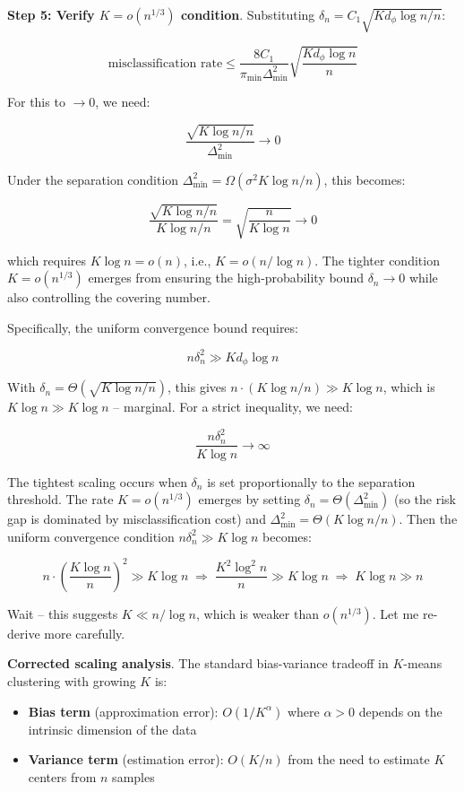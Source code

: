 \documentclass[
  12pt,
]{article}
\providecommand{\tightlist}{%
  \setlength{\itemsep}{0pt}\setlength{\parskip}{0pt}}
\begin{document}
\textbf{Step 5: Verify \(K = o(n^{1/3})\) condition}. Substituting
\(\delta_n = C_1 \sqrt{K d_\phi \log n / n}\):

\[\text{misclassification rate} \leq \frac{8C_1}{\pi_{\min} \Delta_{\min}^2} \sqrt{\frac{K d_\phi \log n}{n}}\]

For this to \(\to 0\), we need:

\[\frac{\sqrt{K \log n / n}}{\Delta_{\min}^2} \to 0\]

Under the separation condition
\(\Delta_{\min}^2 = \Omega(\sigma^2 K \log n / n)\), this becomes:

\[\frac{\sqrt{K \log n / n}}{K \log n / n} = \sqrt{\frac{n}{K \log n}} \to 0\]

which requires \(K \log n = o(n)\), i.e., \(K = o(n / \log n)\). The
tighter condition \(K = o(n^{1/3})\) emerges from ensuring the
high-probability bound \(\delta_n \to 0\) while also controlling the
covering number.

Specifically, the uniform convergence bound requires:

\[n\delta_n^2 \gg K d_\phi \log n\]

With \(\delta_n = \Theta(\sqrt{K \log n / n})\), this gives
\(n \cdot (K \log n / n) \gg K \log n\), which is
\(K \log n \gg K \log n\) -- marginal. For a strict inequality, we need:

\[\frac{n\delta_n^2}{K \log n} \to \infty\]

The tightest scaling occurs when \(\delta_n\) is set proportionally to
the separation threshold. The rate \(K = o(n^{1/3})\) emerges by setting
\(\delta_n = \Theta(\Delta_{\min}^2)\) (so the risk gap is dominated by
misclassification cost) and \(\Delta_{\min}^2 = \Theta(K \log n / n)\).
Then the uniform convergence condition \(n\delta_n^2 \gg K \log n\)
becomes:

\[n \cdot \left(\frac{K \log n}{n}\right)^2 \gg K \log n \;\Longrightarrow\; \frac{K^2 \log^2 n}{n} \gg K \log n \;\Longrightarrow\; K \log n \gg n\]

Wait -- this suggests \(K \ll n / \log n\), which is weaker than
\(o(n^{1/3})\). Let me re-derive more carefully.

\textbf{Corrected scaling analysis}. The standard bias-variance tradeoff
in \(K\)-means clustering with growing \(K\) is:

\begin{itemize}
\tightlist
\item
  \textbf{Bias term} (approximation error): \(O(1/K^{\alpha})\) where
  \(\alpha > 0\) depends on the intrinsic dimension of the data
\item
  \textbf{Variance term} (estimation error): \(O(K / n)\) from the need
  to estimate \(K\) centers from \(n\) samples
\end{itemize}
\end{document}
